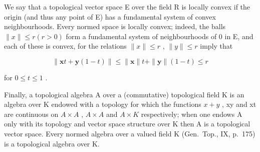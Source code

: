 We say that a topological vector space E over the field R is locally convex if the origin (and thus any point of E) has a fundamental system of convex neighbourhoods. Every normed space is locally convex; indeed, the balls \(\|x\| \leqslant r (r > 0)\) form a fundamental system of neighbourhoods of 0 in E, and each of these is convex, for the relations \(\|x\| \leqslant r\) , \(\|y\| \leqslant r\) imply that

\[
\| \mathbf {x} t + \mathbf {y} (1 - t) \| \leqslant \| \mathbf {x} \| t + \| \mathbf {y} \| (1 - t) \leqslant r
\]

for \(0 \leqslant t \leqslant 1\) .

Finally, a topological algebra A over a (commutative) topological field K is an algebra over K endowed with a topology for which the functions \(x + y\) , xy and xt are continuous on \(A \times A\) , \(A \times A\) and \(A \times K\) respectively; when one endows A only with its topology and vector space structure over K then A is a topological vector space. Every normed algebra over a valued field K (Gen.~Top., IX, p.~175) is a topological algebra over K.

